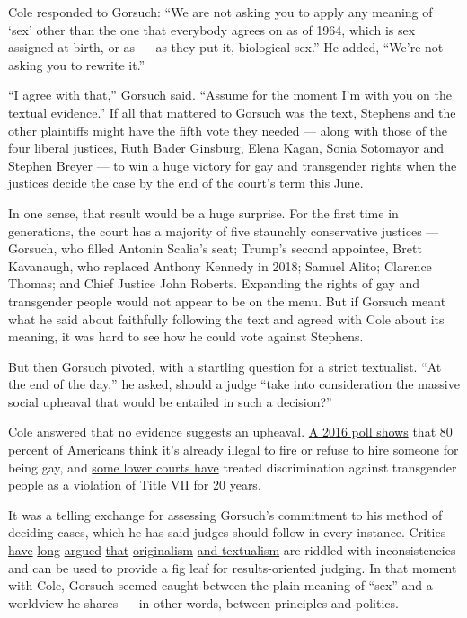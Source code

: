 Cole responded to Gorsuch: ``We are not asking you to apply any meaning
of `sex' other than the one that everybody agrees on as of 1964, which
is sex assigned at birth, or as --- as they put it, biological sex.'' He
added, ``We're not asking you to rewrite it.''

``I agree with that,'' Gorsuch said. ``Assume for the moment I'm with
you on the textual evidence.'' If all that mattered to Gorsuch was the
text, Stephens and the other plaintiffs might have the fifth vote they
needed --- along with those of the four liberal justices, Ruth Bader
Ginsburg, Elena Kagan, Sonia Sotomayor and Stephen Breyer --- to win a
huge victory for gay and transgender rights when the justices decide the
case by the end of the court's term this June.

In one sense, that result would be a huge surprise. For the first time
in generations, the court has a majority of five staunchly conservative
justices --- Gorsuch, who filled Antonin Scalia's seat; Trump's second
appointee, Brett Kavanaugh, who replaced Anthony Kennedy in 2018; Samuel
Alito; Clarence Thomas; and Chief Justice John Roberts. Expanding the
rights of gay and transgender people would not appear to be on the menu.
But if Gorsuch meant what he said about faithfully following the text
and agreed with Cole about its meaning, it was hard to see how he could
vote against Stephens.

But then Gorsuch pivoted, with a startling question for a strict
textualist. ``At the end of the day,'' he asked, should a judge ``take
into consideration the massive social upheaval that would be entailed in
such a decision?''

Cole answered that no evidence suggests an upheaval.
\href{https://www.prri.org/press-release/new-poll-majority-americans-oppose-laws-requiring-transgender-individuals-use-bathrooms-corresponding-sex-birth-rather-gender-identity/}{A
2016 poll shows} that 80 percent of Americans think it's already illegal
to fire or refuse to hire someone for being gay, and
\href{https://transequality.org/federal-case-law-on-transgender-people-and-discrimination}{some
lower courts have} treated discrimination against transgender people as
a violation of Title VII for 20 years.

It was a telling exchange for assessing Gorsuch's commitment to his
method of deciding cases, which he has said judges should follow in
every instance. Critics
\href{https://newrepublic.com/article/81480/republicans-constitution-originalism-popular}{have}
\href{https://scholarship.law.upenn.edu/faculty_scholarship/1478/}{long}
\href{https://www.cambridge.org/core/books/originalism-as-faith/24BD81CE5C34480BEDB02E3C004137DE}{argued}
\href{https://www.nytimes3xbfgragh.onion/2017/03/22/opinion/the-problems-with-originalism.html}{that}
\href{https://www.law.du.edu/documents/denver-university-law-review/v88-3/Greene.pdf}{originalism}
\href{https://www.law.upenn.edu/live/files/71-somin158upalrev2352010pdf}{and
textualism} are riddled with inconsistencies and can be used to provide
a fig leaf for results-oriented judging. In that moment with Cole,
Gorsuch seemed caught between the plain meaning of ``sex'' and a
worldview he shares --- in other words, between principles and politics.

